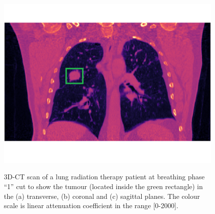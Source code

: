 \begin{figure}[H]
\begin{center}
{\includegraphics[scale=.2]{MotionCorrection/thoraxmagma_2.png} 
}\hfill
{}\hfill
\hspace*{\fill} 

\caption[A single 3D CT image from the POPI model]{\label{fig:realthorax} 3D-CT scan of a lung radiation therapy patient at breathing phase ``1'' cut to show the tumour (located inside the green rectangle) in the (a) transverse, (b) coronal and (c) sagittal planes.  The colour scale is linear attenuation coefficient in the range [0-2000].} 
\end{center} 
\end{figure}



